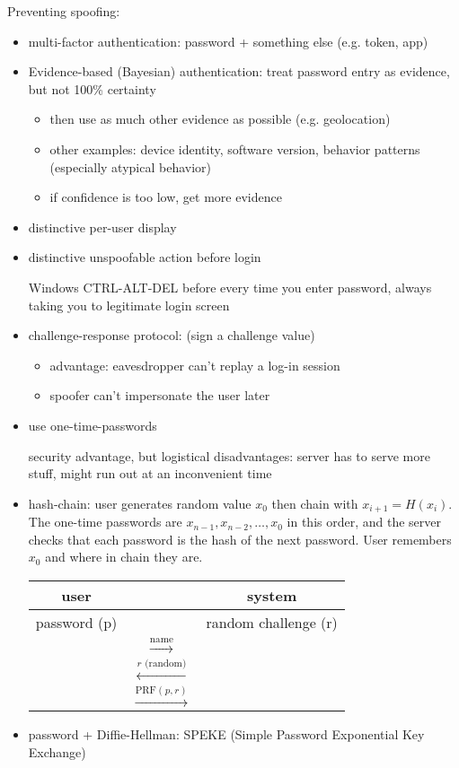 Preventing spoofing:
\begin{itemize}
     \item multi-factor authentication: password + something else (e.g. token, app) 
     \item Evidence-based (Bayesian) authentication: treat password entry as evidence, but not 100\% certainty
     	\begin{itemize}
	\item then use as much other evidence as possible (e.g. geolocation)
	\item other examples: device identity, software version, behavior patterns (especially atypical behavior)
	\item if confidence is too low, get more evidence
	\end{itemize}
    \item distinctive per-user display
    \item distinctive unspoofable action before login

        Windows CTRL-ALT-DEL before every time you enter password, always taking
        you to legitimate login screen
    \item challenge-response protocol: (sign a challenge value)
    	\begin{itemize}
	\item advantage: eavesdropper can't replay a log-in session
	\item spoofer can't impersonate the user later
	\end{itemize}
    \item use one-time-passwords

        security advantage, but logistical disadvantages: server has to serve
        more stuff, might run out at an inconvenient time
    \item hash-chain: user generates random value $x_0$ then chain with
        $x_{i+1} = H(x_i)$. The one-time passwords are
        $x_{n-1}, x_{n-2}, \dots, x_0$ in this order, and the server checks that
        each password is the hash of the next password. User remembers $x_0$
        and where in chain they are.
        \begin{table}\centering\begin{tabular}{ccc}
            user & & system\\
            \hline
            password (p) & & random challenge (r) \\
            & $\xrightarrow{\text{name}}$ & \\
            & $\xleftarrow{r \text{ (random)}}$ & \\
            & $\xrightarrow{\text{PRF} (p,r)}$ &
        \end{tabular}\end{table}
    \item password + Diffie-Hellman: SPEKE (Simple Password Exponential Key
            Exchange)


\end{itemize}
